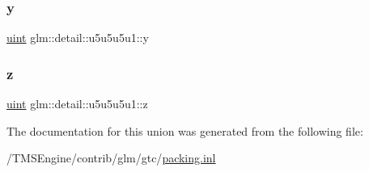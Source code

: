 \subsubsection{\texorpdfstring{y}{y}}
{\footnotesize\ttfamily \hyperlink{group__core__precision_ga4fd29415871152bfb5abd588334147c8}{uint} glm\+::detail\+::u5u5u5u1\+::y}

\mbox{\label{unionglm_1_1detail_1_1u5u5u5u1_a110d067e1f37f6137c2806102c4508f6}} 
\subsubsection{\texorpdfstring{z}{z}}
{\footnotesize\ttfamily \hyperlink{group__core__precision_ga4fd29415871152bfb5abd588334147c8}{uint} glm\+::detail\+::u5u5u5u1\+::z}



The documentation for this union was generated from the following file\+:\begin{DoxyCompactItemize}
\item 
/\+T\+M\+S\+Engine/contrib/glm/gtc/\hyperlink{packing_8inl}{packing.\+inl}\end{DoxyCompactItemize}
